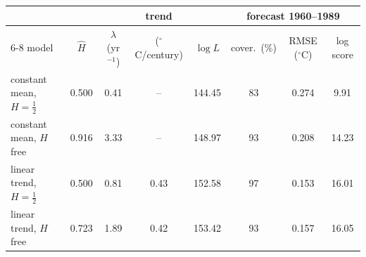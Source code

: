 \begin{tabular}{lccccccc}\toprule
 & & & trend & & \multicolumn{3}{c}{forecast 1960--1989}\\\cmidrule(lr){6-8}
model & $\hat H$ & $\hat\lambda$ (yr$^{-1}$) & ($^\circ$C/century) & $\log L$ & cover.\ (\%) & RMSE ($^\circ$C) & log score\\\midrule
constant mean, $H=\frac12$ & 0.500 & 0.41 & -- & 144.45 & 83 & 0.274 & 9.91\\
constant mean, $H$ free & 0.916 & 3.33 & -- & 148.97 & 93 & 0.208 & 14.23\\
linear trend, $H=\frac12$ & 0.500 & 0.81 & 0.43 & 152.58 & 97 & 0.153 & 16.01\\
linear trend, $H$ free & 0.723 & 1.89 & 0.42 & 153.42 & 93 & 0.157 & 16.05\\
\bottomrule\end{tabular}